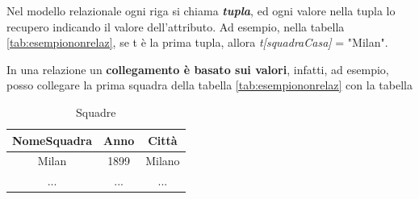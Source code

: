\documentclass{article}
\begin{document}
Nel modello relazionale ogni riga si chiama \textbf{\textit{tupla}}, ed ogni valore nella tupla lo recupero indicando il valore dell'attributo. Ad esempio, nella tabella \ref{tab:esempiononrelaz}, se t è la prima tupla, allora \textit{t[squadraCasa]} = "Milan".

In una relazione un \textbf{collegamento è basato sui valori}, infatti, ad esempio, posso collegare la prima squadra della tabella \ref{tab:esempiononrelaz} con la tabella
\begin{table}[h!]
    \centering
    \begin{tabular}{|c|c|c|}
    \hline
    \textbf{NomeSquadra} & \textbf{Anno} &\textbf{Città} \\
    \hline
        Milan & 1899 & Milano \\
        \hline
        ... & ... & ...\\
        \hline
    \end{tabular}
    \caption{Squadre}
    \label{tab:squadre}
\end{table}

\newpage
\end{document}
